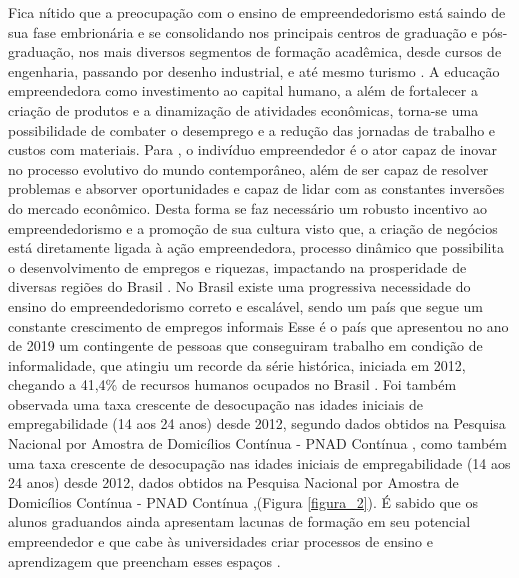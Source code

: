 Fica nítido que a preocupação com o ensino de empreendedorismo está saindo de sua fase embrionária e se consolidando nos principais centros de graduação e pós-graduação, nos mais diversos segmentos de formação acadêmica, desde cursos de engenharia, passando por desenho industrial, e até mesmo turismo \cite{henrique_praticas_2008}. A educação empreendedora como investimento ao capital humano, a além de fortalecer a criação de produtos e a dinamização de atividades econômicas, torna-se uma possibilidade de combater o desemprego \cite{morais_empreendedorismo_2018} e a redução das jornadas de trabalho e custos com materiais. Para , o indivíduo empreendedor é o ator capaz de inovar no processo evolutivo do mundo contemporâneo, além de ser capaz de resolver problemas e absorver oportunidades e capaz de lidar com as constantes inversões do mercado econômico. Desta forma se faz necessário um robusto incentivo ao empreendedorismo e a promoção de sua cultura visto que, a criação de negócios está diretamente ligada à ação empreendedora, processo dinâmico que possibilita o desenvolvimento de empregos e riquezas, impactando na prosperidade de diversas regiões do Brasil \cite{leite_aprendizagem_2015}.
No Brasil existe uma progressiva necessidade do ensino do empreendedorismo correto e escalável, sendo um país que segue um constante crescimento de empregos informais Esse é o país que apresentou no ano de 2019 um contingente de pessoas que conseguiram trabalho em condição de informalidade, que atingiu um recorde da série histórica, iniciada em 2012, chegando a 41,4\% de recursos humanos ocupados no Brasil \cite{ibge_informalidade_2019}. Foi também observada uma taxa crescente de desocupação nas idades iniciais de empregabilidade (14 aos 24 anos) desde 2012, segundo dados obtidos na Pesquisa Nacional por Amostra de Domicílios Contínua - PNAD Contínua  \cite{ibge_informalidade_2019}, como também uma taxa crescente de desocupação nas idades iniciais de empregabilidade (14 aos 24 anos) desde 2012, dados obtidos na Pesquisa Nacional por Amostra de Domicílios Contínua - PNAD Contínua \cite{ibge_instituto_brasileiro_de_geografia_e_estatistica_pesquisa_2019},(Figura \ref{figura_2}). É sabido que os alunos graduandos ainda apresentam lacunas de formação em seu potencial empreendedor e que cabe às universidades criar processos de ensino e aprendizagem que preencham esses espaços  \cite{pietrovski_alise_2019}.



